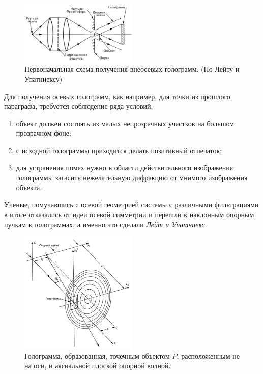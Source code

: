 \begin{figure}
     \centering
     \includegraphics[width=0.5\textwidth]{figures/leyt_holo.png}
     \caption{Первоначальная схема получения внеосевых голограмм. (По Лейту и Упатниексу)}
 \end{figure}
Для получения осевых голограмм, как например, для точки из прошлого параграфа, требуется соблюдение ряда условий:
\begin{enumerate}
	\item объект должен состоять из малых непрозрачных участков на большом прозрачном фоне;
	\item с исходной голограммы приходится делать позитивный отпечаток;
	\item для устранения помех нужно в области действительного изображения голограммы загасить нежелательную дифракцию  от мнимого изображения объекта.
\end{enumerate}
Ученые, помучавшись с осевой геометрией системы с различными фильтрациями в итоге отказались от идеи осевой симметрии и перешли к наклонным опорным пучкам в голограммах, а именно это сделали \textit{Лейт и Упатниекс}. 

\begin{figure}[htb]
     \centering
     \includegraphics[width=0.5\textwidth]{figures/naclon_holo.png}
     \caption{Голограмма, образованная, точечным объектом $P$, расположенным не на оси, и аксиальной плоской опорной волной. }
     \label{fig:naclon}
 \end{figure}

